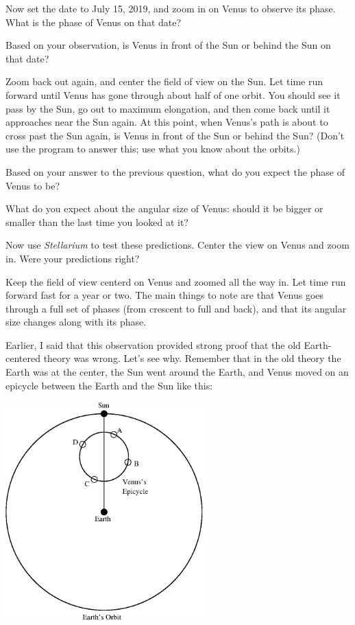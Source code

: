 Now set the date to July 15, 2019, and 
zoom in on Venus to observe its phase.  What is the phase of Venus on that date?

\answerspace{ 0.7in}

Based on your observation, is Venus in front of the Sun or behind the Sun
on that date?

\answerspace{ 0.7in}

Zoom back out again, and center the field of view on the Sun.  Let time
run forward until Venus has gone through about half of one orbit.  You
should see it pass by the Sun, go out to maximum elongation, and then come
back until it approaches near the Sun again.  At this point, when
Venus's path is about to cross past the Sun again, is Venus in front
of the Sun or behind the Sun?  (Don't use the program to answer this; 
use what you know about the orbits.)

\answerspace{ 0.7in}

Based on your answer to the previous question, what do you expect the 
phase of Venus to be?

\answerspace{ 0.7in}

What do you expect about the angular size of Venus: should it be bigger
or smaller than the last time you looked at it?

\answerspace{ 0.7in}

Now use \textit{Stellarium} to
test these predictions.
Center the view on Venus and zoom in.
Were your predictions right?

\answerspace{ 0.7in}

Keep the field of view centerd on Venus and zoomed all the way in.  Let time
run forward fast for a year or two.  The main things to note are that
Venus goes through a full set of phases (from crescent to full and back),
and that its angular size changes along with its phase.

Earlier, I said that this observation provided strong proof that
the old Earth-centered theory was wrong.  Let's see why.  Remember that
in the old theory the Earth was at the center, the Sun went around the
Earth, and Venus moved on an epicycle between the Earth and the Sun like this:


\centerline{\includegraphics[width=3in]{phasesofvenus/venus2.eps}}


